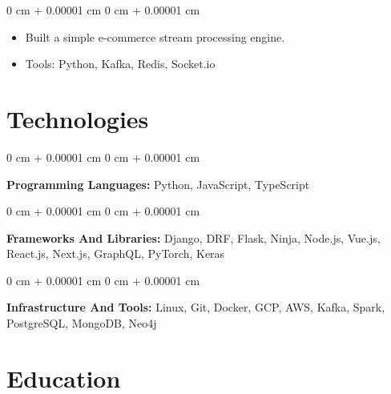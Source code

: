 \documentclass[10pt, letterpaper]{article}
\newenvironment{highlights}{
    \begin{itemize}[
        topsep=0.10 cm,
        parsep=0.10 cm,
        partopsep=0pt,
        itemsep=0pt,
        leftmargin=0 cm + 10pt
    ]
}{
    \end{itemize}
} %
\newenvironment{onecolentry}{
    \begin{adjustwidth}{
        0 cm + 0.00001 cm
    }{
        0 cm + 0.00001 cm
    }
}{
    \end{adjustwidth}
} %
\begin{document}
            \vspace{0.10 cm}
            \begin{onecolentry}
                \begin{highlights}
                    \item Built a simple e-commerce stream processing engine.
                    
                    \item Tools: Python, Kafka, Redis, Socket.io
                \end{highlights}
            \end{onecolentry}
            \vspace{0.2 cm}
        

    


    \section{Technologies}

    
        
            \begin{onecolentry}
                \textbf{Programming Languages:} Python, JavaScript, TypeScript
            \end{onecolentry}
            \vspace{0.2 cm}
        
            \begin{onecolentry}
                \textbf{Frameworks And Libraries:} Django, DRF, Flask, Ninja, Node.js, Vue.js, React.js, Next.js, GraphQL, PyTorch, Keras
            \end{onecolentry}
            \vspace{0.2 cm}
        
            \begin{onecolentry}
                \textbf{Infrastructure And Tools:} Linux, Git, Docker, GCP, AWS, Kafka, Spark, PostgreSQL, MongoDB, Neo4j
            \end{onecolentry}
            \vspace{0.2 cm}
        

    


    \section{Education}

    
        
\end{document}

